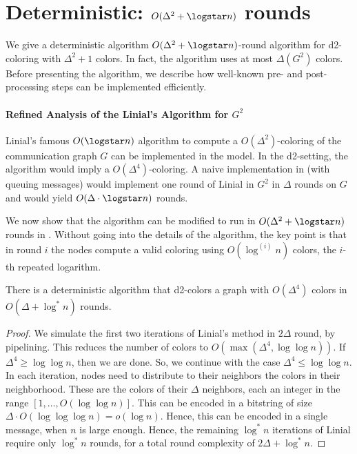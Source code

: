 \section{Deterministic: $O(\Delta^2+\logstar n)$ rounds}
\label{sec:g2-coloring}

We give a deterministic algorithm $O(\Delta^2+\logstar n)$-round algorithm for d2-coloring with $\Delta^2+1$ colors. In fact, the algorithm uses at most $\Delta(G^2)$ colors. Before presenting the algorithm, we describe how well-known pre- and post-processing steps can be implemented efficiently.

\paragraph{Refined Analysis of the Linial's Algorithm for $G^2$}

Linial's famous  $O(\logstar n)$ algorithm to compute a $O(\Delta^2)$-coloring of the communication graph $G$ can be implemented in the {\congest} model. In the d2-setting, the algorithm would imply a $O(\Delta^4)$-coloring. A naive implementation in {\congest} (with queuing messages) would implement one round of Linial in $G^2$ in $\Delta$ rounds on $G$ and would yield $O(\Delta\cdot \logstar n)$ rounds. 

We now show that the algorithm can be modified to run in $O(\Delta^2+\logstar n)$ rounds in {\congest}.
Without going into the details of the algorithm, the key point is that in round $i$ the nodes compute a valid coloring using $O(\log^{(i)} n)$ colors, the $i$-th repeated logarithm. 
\begin{theorem}
\label{thm:Liniald2}
There is a deterministic {\congest} algorithm that d2-colors a graph with $O(\Delta^4)$ colors in $O(\Delta + \log^* n)$  rounds.
\end{theorem}

\begin{proof}
We simulate the first two iterations of Linial's method in $2\Delta$ round, by pipelining.
This reduces the number of colors to $O(\max(\Delta^4, \log\log n))$. 
If $\Delta^4 \ge \log\log n$, then we are done.
So, we continue with the case $\Delta^4 \le \log\log n$.
In each iteration, nodes need to distribute to their neighbors the colors in their neighborhood.
These are the colors of their $\Delta$ neighbors, each an integer in the range $[1,\ldots, O(\log\log n)]$. This can be encoded in a bitstring of size $\Delta \cdot O(\log\log\log n) = o(\log n)$. Hence, this can be encoded in a single {\congest} message, when $n$ is large enough.
Hence, the remaining $\log^* n$ iterations of Linial require only $\log^* n$ rounds, for a total round complexity of $2\Delta + \log^* n$.
\end{proof}

